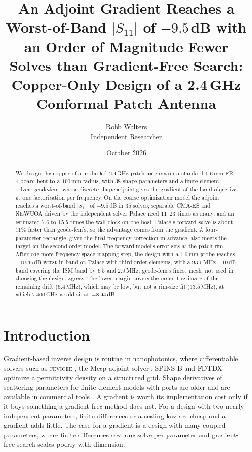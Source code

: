 \documentclass{anvil-paper}
\title{An Adjoint Gradient Reaches a Worst-of-Band $|S_{11}|$ of $-9.5$\,dB
with an Order of Magnitude Fewer Solves than Gradient-Free Search:
Copper-Only Design of a 2.4\,GHz Conformal Patch Antenna}
\author{Robb Walters\\
  {\normalsize Independent Researcher}}
\date{October 2026}
\begin{document}
\maketitle

\begin{abstract}
We design the copper of a probe-fed 2.4\,GHz patch antenna on a standard
$1.6$\,mm FR-4 board bent to a $100$\,mm radius, with 38 shape parameters
and a finite-element solver, geode-fem, whose discrete shape adjoint gives
the gradient of the band objective at one factorization per frequency. On
the coarse optimization model the adjoint reaches a worst-of-band
$|S_{11}|$ of $-9.5$\,dB in $35$ solves; separable CMA-ES and NEWUOA driven
by the independent solver Palace need $11$--$23$ times as many, and an
estimated $7.6$ to $15.5$ times the wall-clock on one host. Palace's forward
solve is about $11\%$ faster than geode-fem's, so the advantage comes from
the gradient. A four-parameter rectangle, given the final frequency
correction in advance, also meets the target on the second-order model. The
forward model's error sits at the patch rim. After one more frequency
space-mapping step, the design with a $1.6$\,mm probe reaches $-10.46$\,dB
worst in band on Palace with third-order elements, with a $93.0$\,MHz
$-10$\,dB band covering the ISM band by $6.5$ and $2.9$\,MHz; geode-fem's
finest mesh, not used in choosing the design, agrees. The lower margin covers
the order-1 estimate of the remaining drift ($6.4$\,MHz), which may be low,
but not a rim-size fit ($13.5$\,MHz), at which $2.400$\,GHz would sit at
$-8.94$\,dB.
\end{abstract}

\section{Introduction}
\label{sec:intro}

Gradient-based inverse design is routine in nanophotonics, where
differentiable solvers such as \textsc{ceviche} \citep{hughes2019forward},
the Meep adjoint solver \citep{hammond2022meepadjoint}, SPINS-B
\citep{su_spinsb} and FDTDX \citep{mahlau2026fdtdx} optimize a permittivity
density on a structured grid. Shape derivatives of scattering parameters for
finite-element models with ports are older
\citep{webb2000design,webb2002design,nikolova2004adjoint} and are available
in commercial tools
\citep{ansys_hfss_derivatives,comsol_sensitivity_method}. A gradient is worth
its implementation cost only if it buys something a gradient-free method
does not. For a design with two nearly independent parameters, finite
differences or a scaling law are cheap and a gradient adds little. The case
for a gradient is a design with many coupled parameters, where finite
differences cost one solve per parameter and gradient-free search scales
poorly with dimension.
\end{document}
